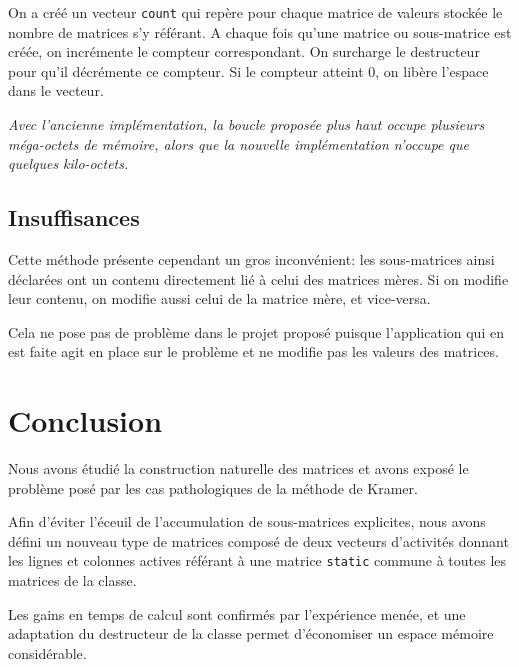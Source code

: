 \documentclass[a4paper,11pt]{article}
\newenvironment{remarque}%
{\description\item[Remarque.]\sl}%
{\enddescription}
\begin{document}
On a créé un vecteur \texttt{count} qui repère pour chaque matrice de valeurs stockée le nombre de matrices s'y référant. A chaque fois qu'une matrice ou sous-matrice est créée, on incrémente le compteur correspondant. On surcharge le destructeur pour qu'il décrémente ce compteur. Si le compteur atteint 0, on libère l'espace dans le vecteur.

\begin{remarque}
Avec l'ancienne implémentation, la boucle proposée plus haut occupe plusieurs méga-octets de mémoire, alors que la nouvelle implémentation n'occupe que quelques kilo-octets.
\end{remarque}

\subsection{Insuffisances}

Cette méthode présente cependant un gros inconvénient: les sous-matrices ainsi déclarées ont un contenu directement lié à celui des matrices mères. Si on modifie leur contenu, on modifie aussi celui de la matrice mère, et vice-versa.

Cela ne pose pas de problème dans le projet proposé puisque l'application qui en est faite agit en place sur le problème et ne modifie pas les valeurs des matrices.

\section*{Conclusion}

Nous avons étudié la construction naturelle des matrices et avons exposé le problème posé par les cas pathologiques de la méthode de Kramer.

Afin d'éviter l'éceuil de l'accumulation de sous-matrices explicites, nous avons défini un nouveau type de matrices composé de deux vecteurs d'activités donnant les lignes et colonnes actives référant à une matrice \texttt{static} commune à toutes les matrices de la classe.

Les gains en temps de calcul sont confirmés par l'expérience menée, et une adaptation du destructeur de la classe permet d'économiser un espace mémoire considérable. 
\end{document}
